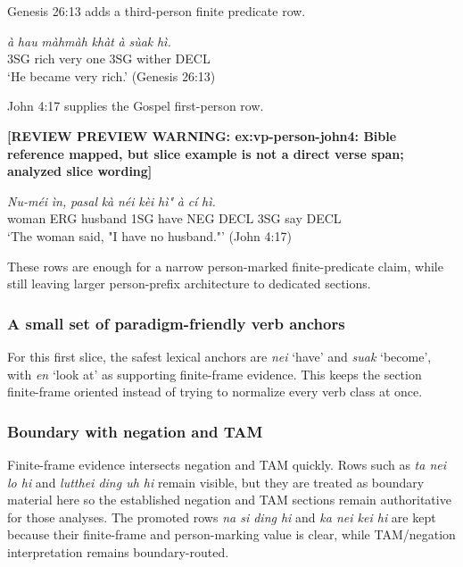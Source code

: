 \documentclass[
  11pt,
  a4paper,
]{article}
\newcommand{\tdim}[1]{\textit{#1}}
\newcommand{\tdimword}[1]{\textit{#1}}
\renewcommand{\textsc}[1]{{\footnotesize\MakeUppercase{#1}}}
\newcommand{\glossquote}[1]{`#1'}
\newcommand{\reviewwarninginline}[1]{\textbf{#1}\par\smallskip}
\begin{document}
Genesis 26:13 adds a third-person finite predicate row.

\begin{exe}
\ex \label{ex:vp-person-gen26}
\gll \tdimword{à} \tdimword{hau} \tdimword{màhmàh} \tdimword{khàt} \tdimword{à} \tdimword{sùak} \tdimword{hì.} \\
     \textsc{3sg} rich very one \textsc{3sg} wither \textsc{decl} \\
\glt \glossquote{He became very rich.} (Genesis 26:13)
\end{exe}

John 4:17 supplies the Gospel first-person row.

\begin{exe}
\ex \label{ex:vp-person-john4}
\reviewwarninginline{[REVIEW PREVIEW WARNING: ex:vp-person-john4: Bible reference mapped, but slice example is not a direct verse span; analyzed slice wording]}
\gll \tdimword{Nu-méi} \tdimword{ìn,} \tdimword{pasal} \tdimword{kà} \tdimword{néi} \tdimword{kèi} \tdimword{hì"} \tdimword{à} \tdimword{cí} \tdimword{hì.} \\
     woman \textsc{erg} husband \textsc{1sg} have \textsc{neg} \textsc{decl} \textsc{3sg} say \textsc{decl} \\
\glt \glossquote{The woman said, "I have no husband."} (John 4:17)
\end{exe}

These rows are enough for a narrow person-marked finite-predicate claim,
while still leaving larger person-prefix architecture to dedicated
sections.

\subsubsection{A small set of paradigm-friendly verb
anchors}\label{a-small-set-of-paradigm-friendly-verb-anchors}

For this first slice, the safest lexical anchors are \tdim{nei}
\glossquote{have} and \tdim{suak} \glossquote{become}, with \tdim{en}
\glossquote{look at} as supporting finite-frame evidence. This keeps the
section finite-frame oriented instead of trying to normalize every verb
class at once.

\subsubsection{Boundary with negation and
TAM}\label{boundary-with-negation-and-tam}

Finite-frame evidence intersects negation and TAM quickly. Rows such as
\tdim{ta nei lo hi} and \tdim{lutthei ding uh hi} remain visible, but
they are treated as boundary material here so the established negation
and TAM sections remain authoritative for those analyses. The promoted
rows \tdim{na si ding hi} and \tdim{ka nei kei hi} are kept because
their finite-frame and person-marking value is clear, while TAM/negation
interpretation remains boundary-routed.
\end{document}
